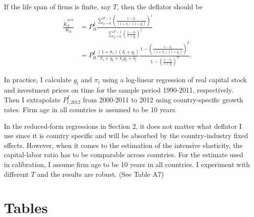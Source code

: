 \documentclass[notitlepage,11pt]{article}%
\begin{document}
If the life span of firms is finite, say $T$, then the deflator should be%
\begin{align*}
\frac{\tilde{K}_{lt}^{acct}}{K_{lt}}  &  =P_{lt}^{I}\frac{\sum_{j=0}%
^{T-1}\left(  \frac{1-\delta_{l}}{\left(  1+\pi_{l}\right)  \left(
1+g_{l}\right)  }\right)  ^{j}}{\sum_{j=0}^{T-1}\left(  \frac{1-\delta_{l}%
}{1+g_{l}}\right)  ^{j}}\\
&  =P_{lt}^{I}\frac{\left(  1+\pi_{l}\right)  \left(  \delta_{l}+g_{l}\right)
}{\pi_{l}+g_{l}+\pi_{l}g_{l}+\delta_{l}}\frac{1-\left(  \frac{1-\delta_{l}%
}{\left(  1+\pi_{l}\right)  \left(  1+g_{l}\right)  }\right)  ^{T}}{1-\left(
\frac{1-\delta_{l}}{1+g_{l}}\right)  ^{T}}.
\end{align*}


In practice, I calculate $g_{l}$ and $\pi_{l}$ using a log-linear regression
of real capital stock and investment prices on time for the sample period
1990-2011, respectively. Then I extrapolate $P_{l,2012}^{I}$ from 2000-2011 to
2012 using country-specific growth rates. Firm age in all countries is assumed
to be 10 years.

In the reduced-form regressions in Section 2, it does not matter what deflator
I use since it is country specific and will be absorbed by the
country-industry fixed effects. However, when it comes to the estimation of
the intensive elasticity, the capital-labor ratio has to be comparable across
countries. For the estimate used in calibration, I assume firm age to be 10
years in all countries. I experiment with different $T$ and the results are
robust. (See Table A7)

\section{Tables}%

\setcounter{table}{0}
\renewcommand{\thetable}{A\arabic{table}}%
%

\newpage%
%

\newpage%
%

\newpage%
%
\end{document}
